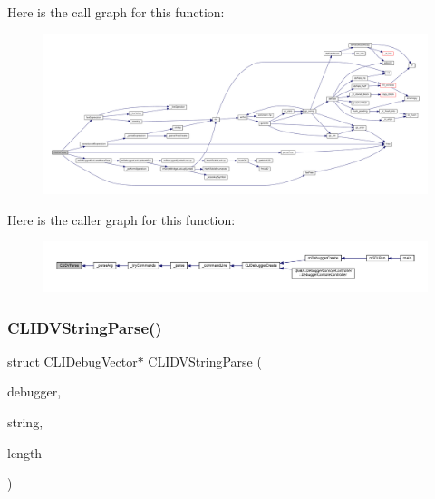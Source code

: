 Here is the call graph for this function\+:
\nopagebreak
\begin{figure}[H]
\begin{center}
\leavevmode
\includegraphics[width=350pt]{debugger_2cli-debugger_8c_a12f3a50d17ea7ee9edd8703a1e57f1ad_cgraph}
\end{center}
\end{figure}
Here is the caller graph for this function\+:
\nopagebreak
\begin{figure}[H]
\begin{center}
\leavevmode
\includegraphics[width=350pt]{debugger_2cli-debugger_8c_a12f3a50d17ea7ee9edd8703a1e57f1ad_icgraph}
\end{center}
\end{figure}
\mbox{\label{debugger_2cli-debugger_8c_a98d7c3768ef0af611a57d21782b34ca1}} 
\subsubsection{\texorpdfstring{C\+L\+I\+D\+V\+String\+Parse()}{CLIDVStringParse()}}
{\footnotesize\ttfamily struct C\+L\+I\+Debug\+Vector$\ast$ C\+L\+I\+D\+V\+String\+Parse (\begin{DoxyParamCaption}\item[{struct C\+L\+I\+Debugger $\ast$}]{debugger,  }\item[{const char $\ast$}]{string,  }\item[{size\+\_\+t}]{length }\end{DoxyParamCaption})}

